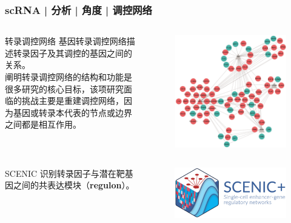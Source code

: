 \documentclass[11pt]{ctexbeamer}
\begin{document}
\begin{frame}
	\frametitle{scRNA | 分析 | 角度 | 调控网络}
	\begin{columns}
	\begin{block}{转录调控网络}
		基因转录调控网络描述转录因子及其调控的基因之间的关系。\\
		阐明转录调控网络的结构和功能是很多研究的核心目标，该项研究面临的挑战主要是重建调控网络，因为基因或转录本代表的节点或边界之间都是相互作用。
	\end{block}
	\begin{figure}
	\includegraphics[width=\textwidth]{scRNA_network_01.png}
\end{figure}
\end{columns}
		\begin{columns}
	\begin{block}{SCENIC}
  识别转录因子与潜在靶基因之间的共表达模块（\textbf{regulon}）。
	\end{block}
	\begin{figure}
		\includegraphics[width=\textwidth]{scRNA_scenic_logo.png}
	\end{figure}
\end{columns}
\end{frame}
\end{document}
